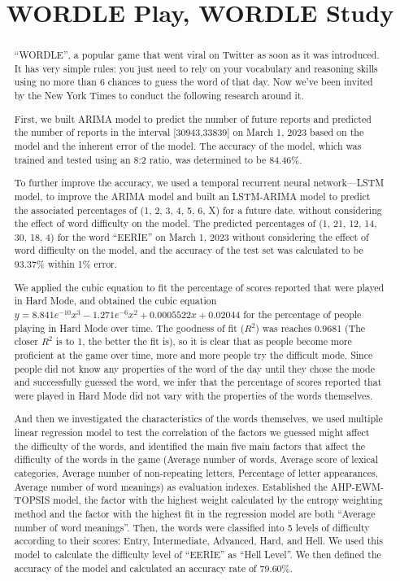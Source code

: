 \documentclass[12pt]{article}  %
\title{WORDLE Play, WORDLE Study}  %
\begin{document}
\begin{abstract}
``WORDLE'', a popular game that went viral on Twitter as soon as it was introduced. It has very simple rules: you just need to rely on your vocabulary and reasoning skills using no more than 6 chances to guess the word of that day. Now we've been invited by the New York Times to conduct the following research around it.

First, we built ARIMA model to predict the number of future reports and predicted the number of reports in the interval [30943,33839] on March 1, 2023 based on the model and the inherent error of the model. The accuracy of the model, which was trained and tested using an 8:2 ratio, was determined to be 84.46\%.

To further improve the accuracy, we used a temporal recurrent neural network---LSTM model, to improve the ARIMA model and built an LSTM-ARIMA model to predict the associated percentages of (1, 2, 3, 4, 5, 6, X) for a future date. without considering the effect of word difficulty on the model. The predicted percentages of (1, 21, 12, 14, 30, 18, 4) for the word ``EERIE'' on March 1, 2023 without considering the effect of word difficulty on the model, and the accuracy of the test set was calculated to be 93.37\% within 1\% error.

We applied the cubic equation to fit the percentage of scores reported that were played in Hard Mode, and obtained the cubic equation $y=8.841e^{-10}x^3-1.271e^{-6}x^2+0.0005522x+0.02044$ for the percentage of people playing in Hard Mode over time. The goodness of fit ($R^2$) was reaches 0.9681 (The closer $R^2$ is to 1, the better the fit is), so it is clear that as people become more proficient at the game over time, more and more people try the difficult mode. Since people did not know any properties of the word of the day until they chose the mode and successfully guessed the word, we infer that the percentage of scores reported that were played in Hard Mode did not vary with the properties of the words themselves.

And then we investigated the characteristics of the words themselves, we used multiple linear regression model to test the correlation of the factors we guessed might affect the difficulty of the words, and identified the main five main factors that affect the difficulty of the words in the game (Average number of words, Average score of lexical categories, Average number of non-repeating letters, Percentage of letter appearances, Average number of word meanings) as evaluation indexes. Established the AHP-EWM-TOPSIS model, the factor with the highest weight calculated by the entropy weighting method and the factor with the highest fit in the regression model are both ``Average number of word meanings''. Then, the words were classified into 5 levels of difficulty according to their scores: Entry, Intermediate, Advanced, Hard, and Hell. We used this model to calculate the difficulty level of ``EERIE'' as ``Hell Level''. We then defined the accuracy of the model and calculated an accuracy rate of 79.60\%.


\end{abstract}
\end{document}
